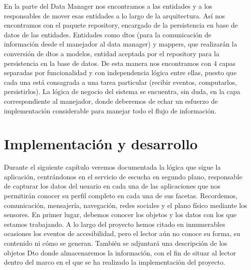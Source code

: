 \documentclass[12pt,a4paper,oneside]{book} %
\begin{document}
\newline \newline
En la parte del Data Manager nos encontramos a las entidades y a los responsables de mover esas entidades a lo largo de la arquitectura. 
\newline \newline
Así nos encontramos con el paquete repository, encargado de la persistencia en base de datos de las entidades. Entidades como dtos (para la comunicación de información desde el manejador al data manager) y mappers, que realizarán la conversión de dtos a modelos, entidad aceptada por el repository para la persistencia en la base de datos. 
\newline \newline
De esta manera nos encontramos con 4 capas separadas por funcionalidad y con independencia lógica entre ellas, puesto que cada una está consagrada a una tarea particular (recibir eventos, computarlos, persistirlos). 
\newline \newline
La lógica de negocio del sistema se encuentra, sin duda, en la capa correspondiente al manejador, donde deberemos de echar un esfuerzo de implementación considerable para manejar todo el flujo de información. 


\chapter{Implementación y desarrollo}
Durante el siguiente capítulo veremos documentada la lógica que sigue la aplicación, centrándonos en el servicio de escucha en segundo plano, responsable de capturar los datos del usuario en cada una de las aplicaciones que nos permitirán conocer su perfil completo en cada una de sus facetas. Recordemos, comunicación, mensajería, navegación, redes sociales y el plano físico mediante los sensores. 
\newline \newline 
En primer lugar, debemos conocer los objetos y los datos con los que estamos trabajando. A lo largo del proyecto hemos citado en innumerables ocasiones los eventos de accesibilidad, pero el lector aún no conoce su forma, su contenido ni cómo se generan. También se adjuntará una descripción de los objetos Dto donde almacenaremos la información, con el fin de situar al lector dentro del marco en el que se ha realizado la implementación del proyecto. 
\newpage
\end{document}
